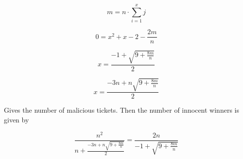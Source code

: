 \documentclass[USenglish,oneside,twocolumn]{article}
\begin{document}

\begin{equation}
m = n \cdot \displaystyle\sum_{i=1}^{x} j
\end{equation}


\begin{equation}
0 = x^{2} + x - 2 - \frac{2m}{n}
\end{equation}

\begin{equation}
x = \frac{-1 + \sqrt{9 + \frac{8m}{n}}}{2}
\end{equation}

\begin{equation}
x = \frac{-3n + n\sqrt{9 + \frac{8m}{n}}}{2}
\end{equation}

Gives the number of malicious tickets. Then the number of innocent winners is given by

\begin{equation}
\frac{n^{2}}{n + \frac{-3n + n \sqrt{9 + \frac{8m}{n}}}{2}} = \frac{2n}{-1 + \sqrt{9 + \frac{8m}{n}}}
\end{equation}

\end{document}
